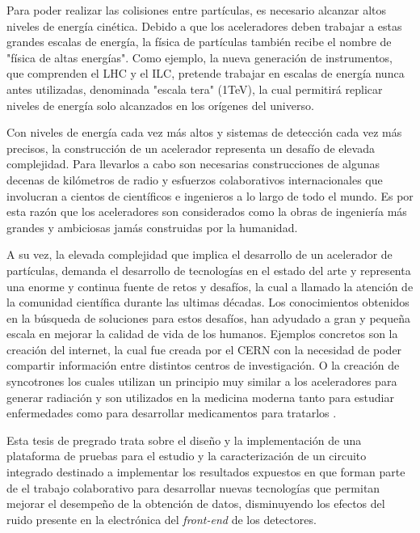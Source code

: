 Para poder realizar las colisiones entre partículas, es necesario alcanzar altos niveles de energía cinética. Debido a que los aceleradores deben trabajar a estas grandes escalas de energía, la física de partículas también recibe el nombre de "física de altas energías". Como ejemplo, la nueva generación de instrumentos, que comprenden el LHC y el ILC, pretende trabajar en escalas de energía nunca antes utilizadas, denominada "escala tera" (1TeV), la cual permitirá replicar niveles de energía solo alcanzados en los orígenes del universo. 

Con niveles de energía cada vez más altos y sistemas de detección cada vez más precisos, la construcción de un acelerador representa un desafío de elevada complejidad. Para llevarlos a cabo son necesarias construcciones de algunas decenas de kilómetros de radio y esfuerzos colaborativos internacionales que involucran a cientos de científicos e ingenieros a lo largo de todo el mundo. Es por esta razón que los aceleradores son considerados como la obras de ingeniería más grandes y ambiciosas jamás construidas por la humanidad.

A su vez, la elevada complejidad que implica el desarrollo de un acelerador de partículas,  demanda el desarrollo de tecnologías en el estado del arte y representa una enorme y continua fuente de retos y desafíos, la cual a llamado la atención de la comunidad científica durante las ultimas décadas.  Los conocimientos obtenidos en la búsqueda de soluciones para estos desafíos, han adyudado a gran y pequeña escala en mejorar la calidad de vida de los humanos. Ejemplos concretos son la creación del internet, la cual fue creada por el CERN con la necesidad de poder compartir información entre distintos centros de investigación. O la creación de syncotrones los cuales utilizan un principio muy similar a los aceleradores para generar radiación y son utilizados en la medicina moderna tanto para estudiar enfermedades como para desarrollar medicamentos para tratarlos \citep{tuttle101}.

Esta tesis de pregrado trata sobre el diseño y la implementación de una plataforma de pruebas para el estudio y  la caracterización de un circuito integrado destinado a implementar los resultados expuestos en \citep{diegothesis} que forman parte de el trabajo colaborativo para desarrollar nuevas tecnologías que permitan mejorar el desempeño de la obtención de datos, disminuyendo los efectos del ruido presente en la electrónica del \textit{front-end} de los detectores.

